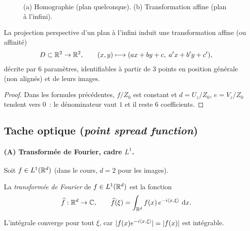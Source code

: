 
\begin{figure}[!htb]\centering
  
  \caption{(a) Homographie (plan quelconque). (b) Transformation affine (plan à l'infini).}\label{fig:homo-affine}
\end{figure}

\begin{proposition}\label{prop:affine}
  La projection perspective d'un plan à l'infini induit une transformation affine (ou \og affinité\fg{})
  \[
    D\subset\mathbb{R}^2\to\mathbb{R}^2,\qquad (x,y)\longmapsto(ax+by+c,\;a'x+b'y+c'),
  \]
  décrite par $6$ paramètres, identifiables à partir de $3$ points en position générale (non alignés) et de leurs images.
\end{proposition}

\begin{proof}
  Dans les formules précédentes, $f/Z_0$ est constant et $d=U_z/Z_0$, $e=V_z/Z_0$ tendent vers $0$~: le dénominateur vaut $1$ et il reste $6$ coefficients.
\end{proof}

\subsection{Tache optique (\emph{point spread function})}


\paragraph{(A) Transformée de Fourier, cadre $L^1$.}
Soit $f\in L^1(\mathbb{R}^d)$ (dans le cours, $d=2$ pour les images).


\begin{definition}\label{def:tf-l1}
  La \emph{transformée de Fourier} de $f\in L^1(\mathbb{R}^d)$ est la fonction
  \[
    \widehat{f}:\mathbb{R}^d\to\mathbb{C},\qquad \widehat{f}(\xi)=\int_{\mathbb{R}^d}f(x)\,e^{-i\langle x,\xi\rangle}\,\mathop{}\!\mathrm{d} x .
  \]
\end{definition}
L'intégrale converge pour tout $\xi$, car $\lvert f(x)e^{-i\langle x,\xi\rangle}\rvert=\lvert f(x)\rvert$ est intégrable.

